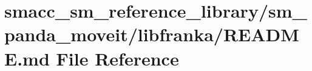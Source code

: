 \hypertarget{smacc__sm__reference__library_2sm__panda__moveit_2libfranka_2README_8md}{}\section{smacc\+\_\+sm\+\_\+reference\+\_\+library/sm\+\_\+panda\+\_\+moveit/libfranka/\+R\+E\+A\+D\+ME.md File Reference}
\label{smacc__sm__reference__library_2sm__panda__moveit_2libfranka_2README_8md}
